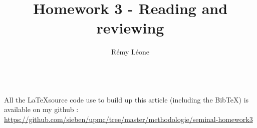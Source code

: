 \documentclass{sig-alternate}
\newcommand{\BibTeX}{{\sc Bib}\TeX}
\begin{document}
\title{Homework 3 - Reading and reviewing}


\author{
  \alignauthor
    Rémy Léone\\
    \\
}

\maketitle







\appendix
\makeatletter
\def\@seccntformat#1{Appendix~\csname the#1\endcsname:\quad}
\makeatother

All the \LaTeX source code use to build up this 
article (including the \BibTeX) is available on my github :
\href{https://github.com/sieben/upmc/tree/master/methodologie/seminal-homework3}{
https://github.com/sieben/upmc/tree/master/methodologie/seminal-homework3}

%
\end{document}
